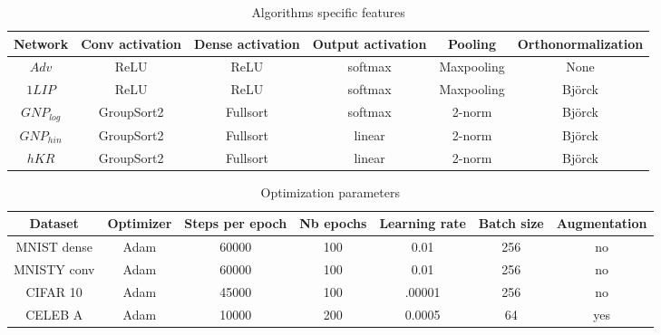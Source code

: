 \begin{table}[]
\centering
\begin{tabular}{|c|c|c|c|c|c|}
\hline
\textbf{Network} & \textbf{Conv activation} & \textbf{Dense activation} & \textbf{Output activation} & \textbf{Pooling} & \textbf{Orthonormalization} \\ \hline
    $Adv$     &        ReLU       &       ReLU              &       softmax                 &       Maxpooling           &             None                \\ \hline
   $1LIP$ &           ReLU       &        ReLU             &           softmax                 &         Maxpooling         &             Björck        \\ \hline
$GNP_{log}$          &GroupSort2  &    Fullsort                &         softmax                   & 2-norm &      Björck              \\ \hline
$GNP_{hin}$          &GroupSort2  &    Fullsort                &         linear                   & 2-norm &      Björck              \\ \hline
$hKR$          &GroupSort2  &    Fullsort                &         linear                   & 2-norm &      Björck              \\ \hline
\end{tabular}
\caption{Algorithms specific features}
  \label{table:arch_features}  
\end{table}

\begin{table}[]
\centering
\begin{tabular}{|c|c|c|c|c|c|c|}
\hline
\textbf{Dataset} & \textbf{Optimizer} & \textbf{Steps per epoch} & \textbf{Nb epochs} & \textbf{Learning rate} &\textbf{Batch size} &  \textbf{Augmentation} \\ \hline
MNIST dense     &        Adam       &       60000              &       100                 &       0.01     & 256&             no                \\ \hline
MNISTY conv &           Adam       &        60000             &           100                 &         0.01  &  256     &             no        \\ \hline
CIFAR 10          &Adam  &    45000                &         100                   & .00001 & 256 &    no              \\ \hline
CELEB A        &Adam  &    10000                &         200                   & 0.0005 &   64  & yes              \\ \hline
\end{tabular}
\caption{Optimization parameters}
 \label{table:opti_params}  
\end{table}

